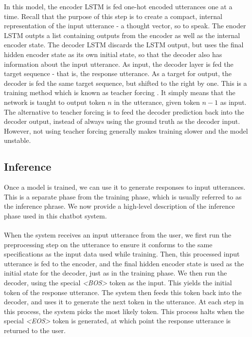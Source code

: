 \documentclass{article}
\begin{document}
In this model, the encoder LSTM is fed one-hot encoded utterances one at a
time. Recall that the purpose of this step is to create a compact, internal
representation of the input utterance - a thought vector, so to speak. The
enoder LSTM outpts a list containing outputs from the encoder as well as the
internal encoder state. The decoder LSTM discards the LSTM output, but uses
the final hidden encoder state as its own initial state, so that the decoder
also has information about the input utterance. As input, the decoder layer
is fed the target sequence - that is, the response utterance. As a target for
output, the decoder is fed the same target sequence, but shifted to the right
by one. This is a training method which is known as teacher forcing
\cite{teacher-forcing}. It simply means that the network is taught to output
token $n$ in the utterance, given token $n-1$ as input. The alternative to
teacher forcing is to feed the decoder prediction back into the decoder output,
instead of always using the ground truth as the decoder input. However, not
using teacher forcing generally makes training slower and the model unstable.

\subsection*{Inference}

Once a model is trained, we can use it to generate responses to input
utterances. This is a separate phase from the training phase, which is usually
referred to as the inference phrase. We now provide a high-level description
of the inference phase used in this chatbot system.

\paragraph{}
When the system receives an input utterance from the user, we first run the
preprocessing step on the utterance to ensure it conforms to the same
specifications as the input data used while training. Then, this processed
input utterance is fed to the encoder, and the final hidden encoder state is
used as the initial state for the decoder, just as in the training phase. We
then run the decoder, using the special \emph{<BOS>} token as the input. This
yields the initial token of the response utterance. The system then feeds this
token back into the decoder, and uses it to generate the next token in the
utterance. At each step in this process, the system picks the most likely
token. This process halts when the special \emph{<EOS>} token is generated,
at which point the response utterance is returned to the user.
\end{document}
